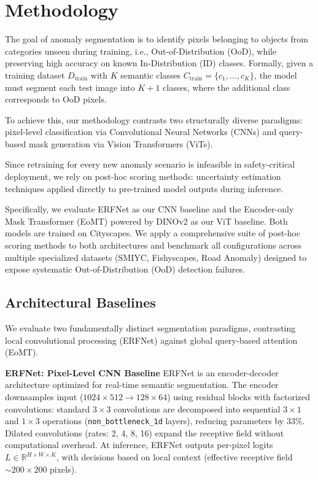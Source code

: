 \section{Methodology}
\label{sec:methodology}

The goal of anomaly segmentation is to identify pixels belonging to objects from categories unseen during training, i.e., Out-of-Distribution (OoD), while preserving high accuracy on known In-Distribution (ID) classes. Formally, given a training dataset $D_{\text{train}}$ with $K$ semantic classes $C_{\text{train}} = \{c_1, \dots, c_K\}$, the model must segment each test image into $K+1$ classes, where the additional class corresponds to OoD pixels.

To achieve this, our methodology contrasts two structurally diverse paradigms: pixel-level classification via Convolutional Neural Networks (CNNs) and query-based mask generation via Vision Transformers (ViTs).

Since retraining for every new anomaly scenario is infeasible in safety-critical deployment, we rely on post-hoc scoring methods: uncertainty estimation techniques applied directly to pre-trained model outputs during inference.

Specifically, we evaluate ERFNet as our CNN baseline and the Encoder-only Mask Transformer (EoMT) powered by DINOv2 as our ViT baseline. Both models are trained on Cityscapes. We apply a comprehensive suite of post-hoc scoring methods to both architectures and benchmark all configurations across multiple specialized datasets (SMIYC, Fishyscapes, Road Anomaly) designed to expose systematic Out-of-Distribution (OoD) detection failures.

\subsection{Architectural Baselines}

We evaluate two fundamentally distinct segmentation paradigms, contrasting local convolutional processing (ERFNet) against global query-based attention (EoMT).

\textbf{ERFNet: Pixel-Level CNN Baseline} ERFNet is an encoder-decoder architecture optimized for real-time semantic segmentation. The encoder downsamples input ($1024\times512 \rightarrow 128\times64$) using residual blocks with factorized convolutions: standard $3\times3$ convolutions are decomposed into sequential $3\times1$ and $1\times3$ operations (\texttt{non\_bottleneck\_1d} layers), reducing parameters by $33\%$. Dilated convolutions (rates: 2, 4, 8, 16) expand the receptive field without computational overhead. At inference, ERFNet outputs per-pixel logits $L \in \mathbb{R}^{H \times W \times K}$, with decisions based on local context (effective receptive field ${\sim}200\times200$ pixels).

